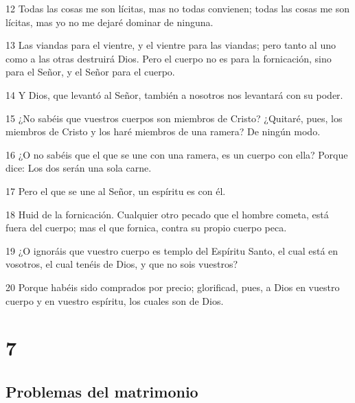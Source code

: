 \par 12 Todas las cosas me son lícitas, mas no todas convienen; todas las cosas me son lícitas, mas yo no me dejaré dominar de ninguna.
\par 13 Las viandas para el vientre, y el vientre para las viandas; pero tanto al uno como a las otras destruirá Dios. Pero el cuerpo no es para la fornicación, sino para el Señor, y el Señor para el cuerpo.
\par 14 Y Dios, que levantó al Señor, también a nosotros nos levantará con su poder.
\par 15 ¿No sabéis que vuestros cuerpos son miembros de Cristo? ¿Quitaré, pues, los miembros de Cristo y los haré miembros de una ramera? De ningún modo.
\par 16 ¿O no sabéis que el que se une con una ramera, es un cuerpo con ella? Porque dice: Los dos serán una sola carne.
\par 17 Pero el que se une al Señor, un espíritu es con él.
\par 18 Huid de la fornicación. Cualquier otro pecado que el hombre cometa, está fuera del cuerpo; mas el que fornica, contra su propio cuerpo peca.
\par 19 ¿O ignoráis que vuestro cuerpo es templo del Espíritu Santo, el cual está en vosotros, el cual tenéis de Dios, y que no sois vuestros?
\par 20 Porque habéis sido comprados por precio; glorificad, pues, a Dios en vuestro cuerpo y en vuestro espíritu, los cuales son de Dios.

\chapter{7}

\section*{Problemas del matrimonio}

